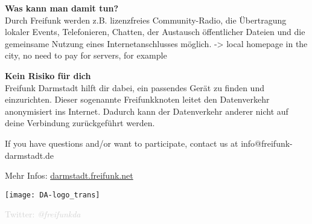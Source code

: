 \documentclass[a4paper]{article}
\begin{document}
\thispagestyle{empty}

\begin{Row}[cellsep=0.75cm]
    \begin{Cell}{1}
    \textbf{Was kann man damit tun?} \\
    Durch Freifunk werden z.B. lizenzfreies Community-Radio, die Übertragung lokaler Events, Telefonieren, Chatten, der Austausch öffentlicher Dateien und die gemeinsame Nutzung eines Internetanschlusses möglich. -> local homepage in the city, no need to pay for servers, for example
    \end{Cell} 
\begin{Cell}{1}
    \textbf{Kein Risiko für dich} \\
Freifunk Darmstadt hilft dir dabei, ein passendes Gerät zu finden und einzurichten. Dieser sogenannte Freifunkknoten leitet den Datenverkehr anonymisiert ins Internet. Dadurch kann der Datenverkehr anderer nicht auf deine Verbindung zurückgeführt werden.
\end{Cell}
\end{Row}

\vspace{1.3cm}
\begin{Row}
    \begin{Cell}{1}
	If you have questions and/or want to participate, contact us at info@freifunk-darmstadt.de
	\end{Cell}
\end{Row}
\vspace{0.5cm}
\begin{center}
	\large Mehr Infos: \url{darmstadt.freifunk.net}
\end{center}
\begin{center}
\vspace{-0.5cm}
\hspace*{-0.05 \paperwidth}\texttt{[image: DA-logo\_trans]}

\vspace{-2.7cm}
\large \textcolor{lightgrey}{Twitter: \textit{@freifunkda}}
\end{center}
\end{document}
